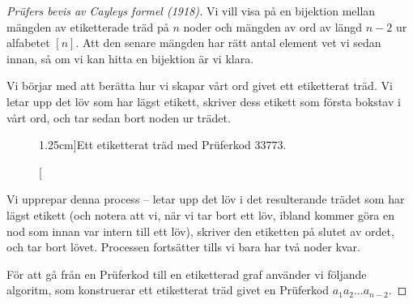 \documentclass[nobib]{tufte-handout}
\begin{document}
\begin{proof}[Prüfers bevis av Cayleys formel (1918)]
    Vi vill visa på en bijektion mellan mängden av etiketterade träd på $n$ noder och mängden av ord av längd $n-2$ ur alfabetet $[n]$. Att den senare mängden har rätt antal element vet vi sedan innan, så om vi kan hitta en bijektion är vi klara.

    Vi börjar med att berätta hur vi skapar vårt ord givet ett etiketterat träd. Vi letar upp det löv som har lägst etikett, skriver dess etikett som första bokstav i vårt ord, och tar sedan bort noden ur trädet.

    \begin{figure}
        \centering
        
        \caption[][1.25cm]{Ett etiketterat träd med Prüferkod $33773$.}
    \end{figure}

    Vi upprepar denna process -- letar upp det löv i det resulterande trädet som har lägst etikett (och notera att vi, när vi tar bort ett löv, ibland kommer göra en nod som innan var intern till ett löv), skriver den etiketten på slutet av ordet, och tar bort lövet. Processen fortsätter tills vi bara har två noder kvar.

    För att gå från en Prüferkod till en etiketterad graf använder vi följande algoritm, som konstruerar ett etiketterat träd givet en Prüferkod $a_1a_2\ldots a_{n-2}$.


\end{proof}
\end{document}
